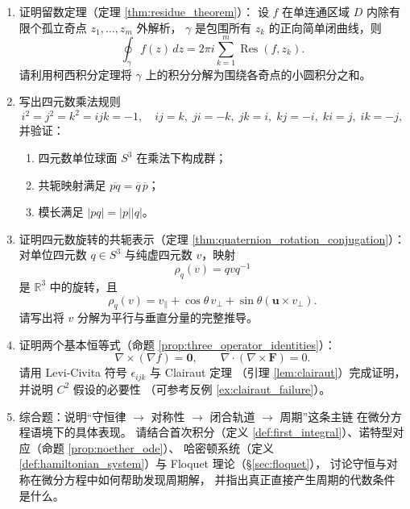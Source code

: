 \begin{enumerate}[leftmargin=3em, label=\textbf{题 \arabic*}]
    \item 证明留数定理（定理 \ref{thm:residue_theorem}）：
    设 $f$ 在单连通区域 $D$ 内除有限个孤立奇点 $z_1,\dots,z_m$ 外解析，
    $\gamma$ 是包围所有 $z_k$ 的正向简单闭曲线，则
    \[
    \oint_\gamma f(z)\,dz=2\pi i\sum_{k=1}^{m}\operatorname{Res}(f,z_k).
    \]
    请利用柯西积分定理将 $\gamma$ 上的积分分解为围绕各奇点的小圆积分之和。

    \item 写出四元数乘法规则
    \[
    i^2=j^2=k^2=ijk=-1,\quad ij=k,\;ji=-k,\;jk=i,\;kj=-i,\;ki=j,\;ik=-j,
    \]
    并验证：
    \begin{enumerate}[label=(\roman*)]
        \item 四元数单位球面 $S^3$ 在乘法下构成群；
        \item 共轭映射满足 $\overline{pq}=\overline{q}\,\overline{p}$；
        \item 模长满足 $|pq|=|p||q|$。
    \end{enumerate}

    \item 证明四元数旋转的共轭表示（定理 \ref{thm:quaternion_rotation_conjugation}）：
    对单位四元数 $q\in S^3$ 与纯虚四元数 $v$，映射
    \[
    \rho_q(v)=qvq^{-1}
    \]
    是 $\mathbb{R}^3$ 中的旋转，且
    \[
    \rho_q(v)=v_\parallel+\cos\theta\,v_\perp+\sin\theta(\mathbf{u}\times v_\perp).
    \]
    请写出将 $v$ 分解为平行与垂直分量的完整推导。

    \item 证明两个基本恒等式（命题 \ref{prop:three_operator_identities}）：
    \[
    \nabla\times(\nabla f)=\mathbf{0},\qquad
    \nabla\cdot(\nabla\times\mathbf{F})=0.
    \]
    请用 Levi-Civita 符号 $\epsilon_{ijk}$ 与 Clairaut 定理
    （引理 \ref{lem:clairaut}）完成证明，并说明 $C^2$ 假设的必要性
    （可参考反例 \ref{ex:clairaut_failure}）。

    \item 综合题：说明“守恒律 $\to$ 对称性 $\to$ 闭合轨道 $\to$ 周期”这条主链
    在微分方程语境下的具体表现。
    请结合首次积分（定义 \ref{def:first_integral}）、诺特型对应（命题 \ref{prop:noether_ode}）、
    哈密顿系统（定义 \ref{def:hamiltonian_system}）与 Floquet 理论（\S\ref{sec:floquet}），
    讨论守恒与对称在微分方程中如何帮助发现周期解，
    并指出真正直接产生周期的代数条件是什么。
\end{enumerate}

